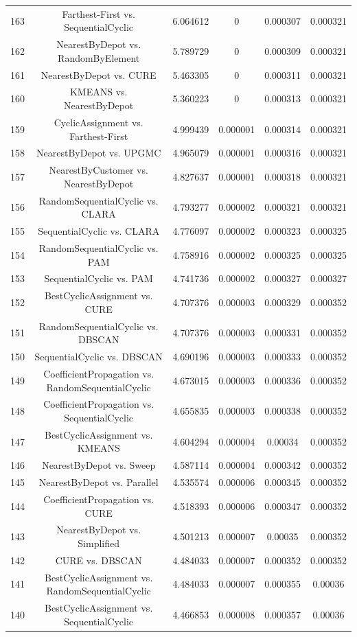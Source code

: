 \documentclass[a4paper,10pt]{article}
\begin{document}
\begin{landscape}
\begin{table}[!htp]
\begin{tabular}{cccccc}
163&Farthest-First vs. SequentialCyclic&6.064612&0&0.000307&0.000321\\
162&NearestByDepot vs. RandomByElement&5.789729&0&0.000309&0.000321\\
161&NearestByDepot vs. CURE&5.463305&0&0.000311&0.000321\\
160&KMEANS vs. NearestByDepot&5.360223&0&0.000313&0.000321\\
159&CyclicAssignment vs. Farthest-First&4.999439&0.000001&0.000314&0.000321\\
158&NearestByDepot vs. UPGMC&4.965079&0.000001&0.000316&0.000321\\
157&NearestByCustomer vs. NearestByDepot&4.827637&0.000001&0.000318&0.000321\\
156&RandomSequentialCyclic vs. CLARA&4.793277&0.000002&0.000321&0.000321\\
155&SequentialCyclic vs. CLARA&4.776097&0.000002&0.000323&0.000325\\
154&RandomSequentialCyclic vs. PAM&4.758916&0.000002&0.000325&0.000325\\
153&SequentialCyclic vs. PAM&4.741736&0.000002&0.000327&0.000327\\
152&BestCyclicAssignment vs. CURE&4.707376&0.000003&0.000329&0.000352\\
151&RandomSequentialCyclic vs. DBSCAN&4.707376&0.000003&0.000331&0.000352\\
150&SequentialCyclic vs. DBSCAN&4.690196&0.000003&0.000333&0.000352\\
149&CoefficientPropagation vs. RandomSequentialCyclic&4.673015&0.000003&0.000336&0.000352\\
148&CoefficientPropagation vs. SequentialCyclic&4.655835&0.000003&0.000338&0.000352\\
147&BestCyclicAssignment vs. KMEANS&4.604294&0.000004&0.00034&0.000352\\
146&NearestByDepot vs. Sweep&4.587114&0.000004&0.000342&0.000352\\
145&NearestByDepot vs. Parallel&4.535574&0.000006&0.000345&0.000352\\
144&CoefficientPropagation vs. CURE&4.518393&0.000006&0.000347&0.000352\\
143&NearestByDepot vs. Simplified&4.501213&0.000007&0.00035&0.000352\\
142&CURE vs. DBSCAN&4.484033&0.000007&0.000352&0.000352\\
141&BestCyclicAssignment vs. RandomSequentialCyclic&4.484033&0.000007&0.000355&0.00036\\
140&BestCyclicAssignment vs. SequentialCyclic&4.466853&0.000008&0.000357&0.00036\\

\end{tabular}
\end{table}
\end{landscape}
\end{document}
